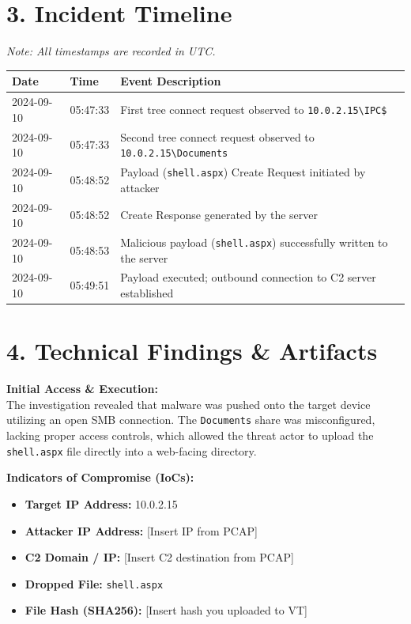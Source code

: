 \documentclass[11pt, a4paper]{article}
\begin{document}
\section*{\textcolor{primary}{3. Incident Timeline}}
\textit{Note: All timestamps are recorded in UTC.}
\vspace{0.2cm}\\
\noindent
\begin{tabularx}{\textwidth}{@{} l l X @{}}
\toprule
\textbf{Date} & \textbf{Time} & \textbf{Event Description} \\
\midrule
2024-09-10 & 05:47:33 & First tree connect request observed to \texttt{10.0.2.15\textbackslash IPC\$} \\
2024-09-10 & 05:47:33 & Second tree connect request observed to \texttt{10.0.2.15\textbackslash Documents} \\
2024-09-10 & 05:48:52 & Payload (\texttt{shell.aspx}) Create Request initiated by attacker \\
2024-09-10 & 05:48:52 & Create Response generated by the server \\
2024-09-10 & 05:48:53 & Malicious payload (\texttt{shell.aspx}) successfully written to the server \\
2024-09-10 & 05:49:51 & Payload executed; outbound connection to C2 server established \\
\bottomrule
\end{tabularx}

\vspace{0.5cm}

\section*{\textcolor{primary}{4. Technical Findings \& Artifacts}}

\textbf{Initial Access \& Execution:} \\
The investigation revealed that malware was pushed onto the target device utilizing an open SMB connection. The \texttt{Documents} share was misconfigured, lacking proper access controls, which allowed the threat actor to upload the \texttt{shell.aspx} file directly into a web-facing directory. 

\vspace{0.3cm}
\noindent \textbf{Indicators of Compromise (IoCs):}
\begin{itemize}[label=\textcolor{secondary}{$\bullet$}, itemsep=2pt]
    \item \textbf{Target IP Address:} 10.0.2.15
    \item \textbf{Attacker IP Address:} [Insert IP from PCAP]
    \item \textbf{C2 Domain / IP:} [Insert C2 destination from PCAP]
    \item \textbf{Dropped File:} \texttt{shell.aspx}
    \item \textbf{File Hash (SHA256):} [Insert hash you uploaded to VT]
\end{itemize}
\vspace{0.3cm}
\end{document}
